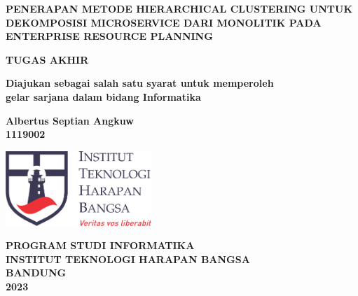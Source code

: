 \begin{titlepage}
	\begin{center}
		\vspace*{0cm}
		
		{\large \bfseries PENERAPAN METODE HIERARCHICAL CLUSTERING UNTUK DEKOMPOSISI MICROSERVICE DARI MONOLITIK PADA ENTERPRISE RESOURCE PLANNING }
			
		\vspace{3cm}
		
	 	{\large \bfseries TUGAS AKHIR}
	 	
	 	\vspace{1cm}
	 	{ \bfseries Diajukan sebagai salah satu syarat untuk memperoleh \\
	 				gelar sarjana dalam bidang Informatika }
 		

		\vspace{1cm}
		
		{ \bfseries Albertus Septian Angkuw \\ 1119002 }
		
	
		\vspace*{\fill} 
		
		\includegraphics[width=5.5cm]{img/ithb.png}
	
		\vspace{2.5cm}

		{\large \bfseries PROGRAM STUDI INFORMATIKA \\
		INSTITUT TEKNOLOGI HARAPAN BANGSA \\
		BANDUNG\\
		2023}
		
		\vspace{1cm}
	\end{center}
\end{titlepage}